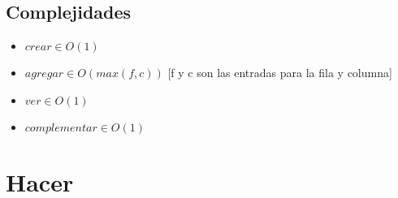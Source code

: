 \documentclass{article}
\begin{document}
\subsection{Complejidades}
\begin{itemize}
    \item $crear\in O(1)$
    \item $agregar\in O(max(f,c))$ [f y c son las entradas para la fila y columna]
    \item $ver\in O(1)$
    \item $complementar\in O(1)$
\end{itemize}

\section{Hacer}
\end{document}

